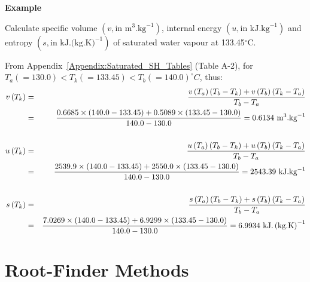    \begin{MyExample}{\begin{center}{\bf Example}\end{center}}
      \begin{example}
         Calculate specific volume $\left(v, \text{in m}^{3}\text{.kg}^{-1}\right)$, internal energy $\left(u, \text{in kJ.kg}^{-1}\right)$ and entropy $\left(s, \text{in kJ.(kg.K)}^{-1}\right)$ of saturated water vapour at 133.45$^{\circ}$C.
     \end{example}

        From Appendix~\ref{Appendix:Saturated_SH_Tables} (Table A-2), for $T_{a}(=130.0) < T_{k} (= 133.45) < T_{b} (=140.0)^{\circ}C$, thus:
               \begin{eqnarray}
                  v\left(T_{k}\right) &=& \displaystyle\frac{v\left(T_{a}\right)\left(T_{b}-T_{k}\right) + v\left(T_{b}\right)\left(T_{k}-T_{a}\right)}{T_{b}-T_{a}} \nonumber \\
                                     &=& \displaystyle\frac{0.6685\times(140.0-133.45) + 0.5089\times(133.45-130.0)}{140.0-130.0} = 0.6134 \text{ m}^{3}\text{.kg}^{-1}\nonumber \\
                                     && \nonumber \\
                  u\left(T_{k}\right) &=& \displaystyle\frac{u\left(T_{a}\right)\left(T_{b}-T_{k}\right) + u\left(T_{b}\right)\left(T_{k}-T_{a}\right)}{T_{b}-T_{a}} \nonumber \\
                                     &=& \displaystyle\frac{2539.9\times(140.0-133.45) + 2550.0\times(133.45-130.0)}{140.0-130.0} = 2543.39 \text{ kJ.kg}^{-1}\nonumber \\
                                     && \nonumber \\
                  s\left(T_{k}\right) &=& \displaystyle\frac{s\left(T_{a}\right)\left(T_{b}-T_{k}\right) + s\left(T_{b}\right)\left(T_{k}-T_{a}\right)}{T_{b}-T_{a}} \nonumber \\
                                     &=& \displaystyle\frac{7.0269\times(140.0-133.45) + 6.9299\times(133.45-130.0)}{140.0-130.0} = 6.9934 \text{ kJ.}\left(\text{kg.K}\right)^{-1}\nonumber 
               \end{eqnarray}
   \end{MyExample}


\section{Root-Finder Methods}\label{Section:RootFinderMethods}

